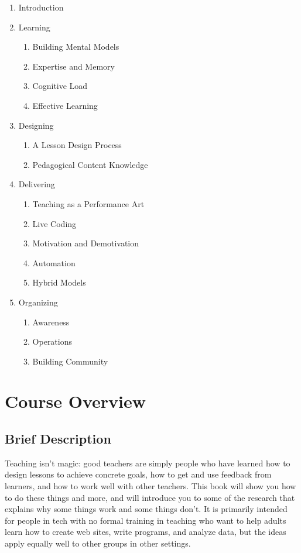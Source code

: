 \begin{enumerate}
\item
  Introduction
\item
  Learning

  \begin{enumerate}
  \item
    Building Mental Models
  \item
    Expertise and Memory
  \item
    Cognitive Load
  \item
    Effective Learning
  \end{enumerate}
\item
  Designing

  \begin{enumerate}
  \item
    A Lesson Design Process
  \item
    Pedagogical Content Knowledge
  \end{enumerate}
\item
  Delivering

  \begin{enumerate}
  \item
    Teaching as a Performance Art
  \item
    Live Coding
  \item
    Motivation and Demotivation
  \item
    Automation
  \item
    Hybrid Models
  \end{enumerate}
\item
  Organizing

  \begin{enumerate}
  \item
    Awareness
  \item
    Operations
  \item
    Building Community
  \end{enumerate}
\end{enumerate}

\section{Course Overview}\label{s:v3-course-overview}

\subsection*{Brief Description}

Teaching isn't magic: good teachers are simply people who have learned
how to design lessons to achieve concrete goals, how to get and use
feedback from learners, and how to work well with other teachers. This
book will show you how to do these things and more, and will introduce
you to some of the research that explains why some things work and some
things don't. It is primarily intended for people in tech with no formal
training in teaching who want to help adults learn how to create web
sites, write programs, and analyze data, but the ideas apply equally
well to other groups in other settings.

